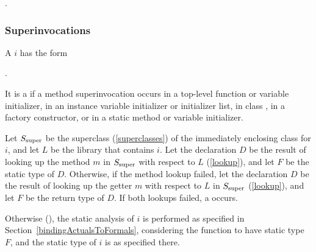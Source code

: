 \documentclass[makeidx]{article}
\begin{document}
{\noindent
{}.



\subsubsection{Superinvocations}


\LMHash{}%
A  $i$ has the form
%

\noindent
{}.


\LMHash{}%
It is a  if a method superinvocation occurs
in a top-level function or variable initializer,
in an instance variable initializer or initializer list,
in class ,
in a factory constructor,
or in a static method or variable initializer.

{ %

\def\SuperClass{\ensuremath{S_{\mbox{\scriptsize{}super}}}}

\LMHash{}%
\BlindDefineSymbol{\SuperClass, L}%
Let \SuperClass{} be the superclass (\ref{superclasses})
of the immediately enclosing class for $i$,
%
and let $L$ be the library that contains $i$.
Let the declaration $D$ be
the result of looking up the method $m$ in \SuperClass{}
with respect to $L$ (\ref{lookup}),
and let $F$ be the static type of $D$.
Otherwise, if the method lookup failed,
let the declaration $D$ be the result of looking up
the getter $m$ with respect to $L$ in \SuperClass{}
(\ref{lookup}),
and let $F$ be the return type of $D$.
If both lookups failed, a  occurs.

\LMHash{}%
Otherwise (),
the static analysis of $i$ is performed
as specified in Section~\ref{bindingActualsToFormals},
considering the function to have static type $F$,
and the static type of $i$ is as specified there.

}}
\end{document}
